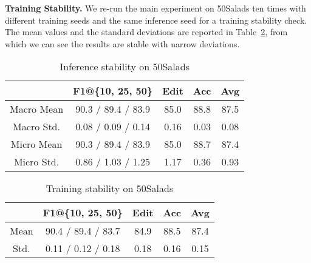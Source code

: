 \documentclass[10pt,twocolumn,letterpaper]{article}
\begin{document}
\textbf{Training Stability.} We re-run the main experiment on 50Salads ten times with different training seeds and the same inference seed for a training stability check.
The mean values and the standard deviations are reported in Table~\ref{table:stability}, from which we can see the results are stable with narrow deviations.

\begin{table} [t]
\begin{center}
\footnotesize
\begin{tabular}{c | c c c c c c }
\hline
  & \multicolumn{3}{c}{F1@\{10, 25, 50\}} & Edit & Acc & Avg \\
\hline
Macro Mean & \multicolumn{3}{c}{ 90.3 / 89.4 / 83.9} & 85.0 & 88.8 & 87.5 \\
Macro Std. & \multicolumn{3}{c}{ 0.08 / 0.09 / 0.14} & 0.16 & 0.03 & 0.08 \\ 
\hline
Micro Mean & \multicolumn{3}{c}{ 90.3 / 89.4 / 83.9} & 85.0 & 88.7 & 87.4 \\
Micro Std. & \multicolumn{3}{c}{ 0.86 / 1.03 / 1.25} & 1.17 & 0.36 & 0.93 \\
\hline
\end{tabular}
\end{center}
\caption{Inference stability on 50Salads}
\label{table:inf-stability}
\end{table}


\begin{table}[t]
\begin{center}
\footnotesize
\begin{tabular}{c | c c c c c c }
\hline
  & \multicolumn{3}{c}{F1@\{10, 25, 50\}} & Edit & Acc & Avg \\
\hline
Mean & \multicolumn{3}{c}{ 90.4 / 89.4 / 83.7 } & 84.9 & 88.5 & 87.4\\
Std. & \multicolumn{3}{c}{ 0.11 / 0.12 / 0.18 } & 0.18 & 0.16 & 0.15\\
\hline
\end{tabular}
\end{center}
\caption{Training stability on 50Salads}
\label{table:stability}
\end{table}
\end{document}
